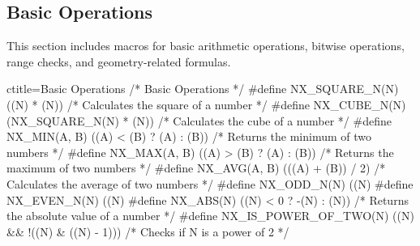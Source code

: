 \newpage
\subsection{Basic Operations}
\label{Basic Operations}
\begin{NexMainBox}
	\begin{NexMainBox}
		This section includes macros for basic arithmetic operations, bitwise operations, range checks, and geometry-related formulas.
	\end{NexMainBox}
\end{NexMainBox}

\begin{NexCodeBox}{c}{title={Basic Operations}}
/* Basic Operations */
#define NX_SQUARE_N(N) ((N) * (N))				/* Calculates the square of a number */
#define NX_CUBE_N(N) (NX_SQUARE_N(N) * (N))			/* Calculates the cube of a number */
#define NX_MIN(A, B) ((A) < (B) ? (A) : (B))			/* Returns the minimum of two numbers */
#define NX_MAX(A, B) ((A) > (B) ? (A) : (B))			/* Returns the maximum of two numbers */
#define NX_AVG(A, B) (((A) + (B)) / 2)				/* Calculates the average of two numbers */
#define NX_ODD_N(N) ((N) %
#define NX_EVEN_N(N) ((N) %
#define NX_ABS(N) ((N) < 0 ? -(N) : (N))			/* Returns the absolute value of a number */
#define NX_IS_POWER_OF_TWO(N) ((N) && !((N) & ((N) - 1)))	/* Checks if N is a power of 2 */
\end{NexCodeBox}

\newpage
